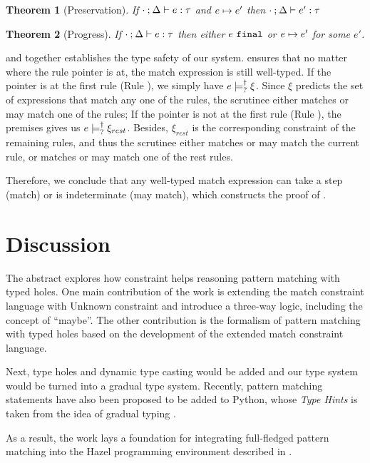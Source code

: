 \documentclass[acmsmall,screen,review,nonacm]{acmart}
\theoremstyle{slplain}
\newtheorem{thm}{Theorem}  %
\numberwithin{thm}{section}
\begin{document}
\begin{thm}[Preservation]
  \label{thrm:preservation}
  If $\cdot \mathbin{;} \Delta \vdash e : \tau$ and $e \mapsto e'$
  then $\cdot \mathbin{;} \Delta \vdash e' : \tau$
\end{thm}

\begin{thm}[Progress]
 \label{thrm:progress}
 If $\cdot \mathbin{;} \Delta \vdash e : \tau$ then either $e ~\mathtt{final}$ or $e \mapsto e'$ for some $e'$.
\end{thm}

 and  together establishes the type safety of our system.
 ensures that no matter where the rule pointer is at, the match expression is still well-typed.
If the pointer is at the first rule (Rule \TMatchZPre), we simply have $e \models_{?}^{\dag} \xi$. Since $\xi$ predicts the set of expressions that match any one of the rules, the scrutinee either matches or may match one of the rules;
If the pointer is not at the first rule (Rule \TMatchNZPre), the premises gives us $e \models_{?}^{\dag} \xi_{rest}$. Besides, $\xi_{rest}$ is the corresponding constraint of the remaining rules, and thus the scrutinee either matches or may match the current rule, or matches or may match one of the rest rules.

Therefore, we conclude that any well-typed match expression can take a step (match) or is indeterminate (may match), which constructs the proof of .

\section{Discussion}
The abstract explores how constraint helps reasoning pattern matching with typed holes.
One main contribution of the work is extending the match constraint language \cite{Harper2012} with Unknown constraint and introduce a three-way logic, including the concept of ``maybe''. The other contribution is the formalism of pattern matching with typed holes based on the development of the extended match constraint language.

Next, type holes and dynamic type casting would be added and our type system would be turned into a gradual type system.
Recently, pattern matching statements have also been proposed to be added to \textsf{Python}, whose \emph{Type Hints} is taken from the idea of gradual typing \cite{pep484,pep622,Siek2006}.

As a result, the work lays a foundation for integrating full-fledged pattern matching into the \textsf{Hazel} programming environment described in \citet{DBLP:journals/pacmpl/OmarVCH19}.

\clearpage



\end{document}
